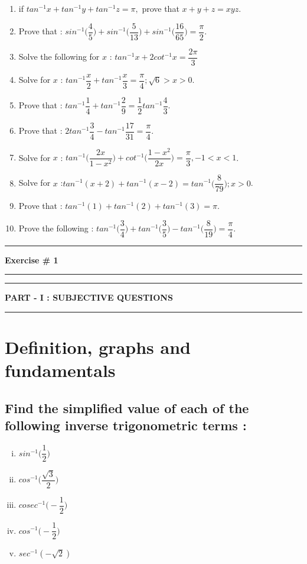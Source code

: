\documentclass[a4paper,10pt]{article}
\newcommand{\exercise}[1]{\begin{center}\hrule \vspace{5mm}\Huge
{\textbf{#1}} \vspace{5mm} \hrule \end{center}}
\newcommand{\questiontype}[1]{\begin{center}\hrule \vspace{2mm}
\Large{\textbf{#1}}\vspace{2mm}\hrule \end{center}}
\begin{document}
\begin{enumerate}[Type (I):]
\begin{enumerate}[1.]
\item if $tan^{-1}x+tan^{-1}y+tan^{-1}z=\pi,$ prove that $x+y+z=xyz$.
\vspace{5mm}
\item Prove that :
$sin^{-1}\bigg(\dfrac{4}{5}\bigg)+sin^{-1}\bigg(\dfrac{5}{13}\bigg)+sin^{-1}\bigg(\dfrac{16}{65}\bigg)=\dfrac{\pi}{2}$.
\vspace{5mm}
\item Solve the following for $x$ : $tan^{-1}x+2 cot^{-1}x=\dfrac{2\pi}{3}$
\vspace{5mm}
\item Solve for $x$ :
$tan^{-1}\dfrac{x}{2}+tan^{-1}\dfrac{x}{3}=\dfrac{\pi}{4};\sqrt{6}>x>0$.
\vspace{5mm}
\item Prove that :
$tan^{-1}\dfrac{1}{4}+tan^{-1}\dfrac{2}{9}=\dfrac{1}{2}tan^{-1}\dfrac{4}{3}$.
\vspace{5mm}
\item Prove that :
$2tan^{-1}\dfrac{3}{4}-tan^{-1}\dfrac{17}{31}=\dfrac{\pi}{4}$.
\vspace{5mm} 
\item Solve for $x$ :
$tan^{-1}\bigg(\dfrac{2x}{1-x^2}\bigg)+cot^{-1}\bigg(\dfrac{1-x^2}{2x}\bigg)=\dfrac{\pi}{3},-1<x<1$.
\vspace{5mm} 
\item Solve for $x$
:$tan^{-1}(x+2)+tan^{-1}(x-2)=tan^{-1}\bigg(\dfrac{8}{79}\bigg) ; x>0$.
\vspace{5mm} 
\item Prove that : $tan^{-1}(1)+tan^{-1}(2)+tan^{-1}(3)=\pi$.
\vspace{5mm} 
\item Prove the following :
$tan^{-1}\bigg(\dfrac{3}{4}\bigg)+tan^{-1}\bigg(\dfrac{3}{5}\bigg)-tan^{-1}\bigg(\dfrac{8}{19}\bigg)=\dfrac{\pi}{4}$.
\end{enumerate}
\end{enumerate}
\exercise{Exercise \# 1}
\questiontype{PART - I : SUBJECTIVE QUESTIONS}
\section{Definition, graphs and fundamentals}
\subsection{Find the simplified value of each of the following inverse
trigonometric terms :}
\vspace{5mm} 
\begin{multicols}{2}
\begin{enumerate}[(i)]
\item $sin^{-1}\bigg(\dfrac{1}{2}\bigg)$
\item $cos^{-1}\bigg(\dfrac{\sqrt{3}}{2}\bigg)$
\item $cosec^{-1}\bigg(-\dfrac{1}{2}\bigg)$
\item $cos^{-1}\bigg(-\dfrac{1}{2}\bigg)$
\item $sec^{-1}(-\sqrt{2})$
\end{enumerate}
\end{multicols}
\end{document}
